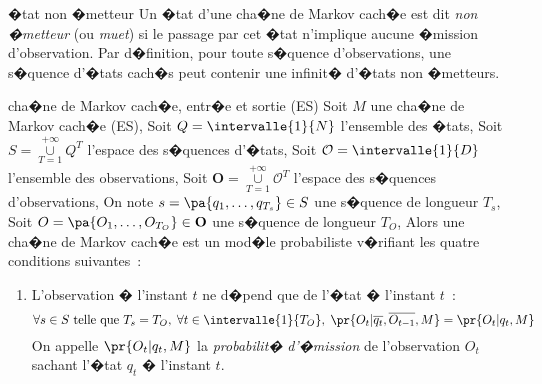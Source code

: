         \begin{xdefinition}{�tat non �metteur}
        \label{definition_etat_non_emetteur}%
        Un �tat d'une cha�ne de Markov cach�e est dit \emph{non �metteur} (ou \emph{muet}) 
        si le passage par cet �tat n'implique 
        aucune �mission d'observation. Par d�finition, pour toute s�quence d'observations, 
        une s�quence d'�tats cach�s peut 
        contenir une infinit� d'�tats non �metteurs.
        \end{xdefinition}



        \begin{xdefinition}{cha�ne de Markov cach�e, entr�e et sortie (ES)}
        \label{markov_chaine_cachee_definition_es}%
        Soit $M$ une cha�ne de Markov cach�e (ES),\newline%
        Soit $Q = \intervalle{1}{N}$ l'ensemble des �tats,\newline%
        Soit $S=\underset{T=1} {\overset{+\infty}{\cup}} Q^T$ l'espace des s�quences d'�tats,\newline%
        Soit $\mathcal{O} = \intervalle{1}{D}$ l'ensemble des observations,\newline%
        Soit $\mathbf{O}=\underset{T=1} {\overset{+\infty}{\cup}} \mathcal{O}^T$ l'espace des s�quences d'observations,\newline%
        On note $s = \pa{q_1,\dots,q_{T_s}} \in S$ une s�quence de longueur $T_s$,\newline%
        Soit $O = \pa{O_1,\dots,O_{T_O}} \in \mathbf{O}$ une s�quence de longueur $T_O$,\newline%
        Alors une cha�ne de Markov cach�e est un mod�le probabiliste v�rifiant les quatre conditions suivantes~:
                \begin{enumerate}
                \item L'observation � l'instant $t$ ne d�pend que de l'�tat � l'instant $t$~:
                    $$
                    \forall s \in S \text{ telle que } T_s = T_O, \; \forall t \in \intervalle{1}{T_O}, \;
                    \pr{O_t|\overline{q_t},\overline{O_{t-1}},M} = \pr{O_t|q_t,M}
                    $$
                    On appelle $\pr{O_t|q_t,M}$ la \emph{probabilit� d'�mission} de l'observation $O_t$ 
                    sachant l'�tat $q_t$ � l'instant $t$.
                    

\end{enumerate}
\end{xdefinition}
